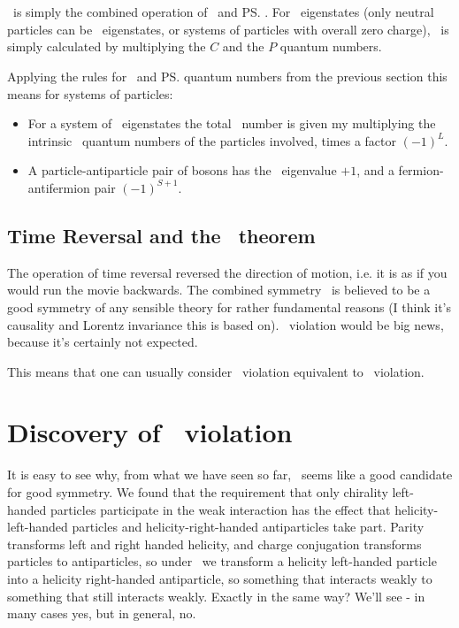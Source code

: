 \section{\cp}
\label{sec:CPV_CP}
 \cp\ is simply the combined operation of \cs\ and \ps.
 For \cp\ eigenstates (only neutral particles can be \cp\ eigenstates, or
 systems of particles with overall zero charge), \cp\ is simply
 calculated by multiplying the $C$ and the $P$ quantum numbers.

 Applying the rules for \cs\ and \ps quantum numbers from the
 previous section this means for systems of particles:
\begin{itemize}
\item For a system of \cp\ eigenstates the total \cp\ number is given my
  multiplying the intrinsic \cp\ quantum numbers of the particles
  involved, times a factor $(-1)^L$.
\item A particle-antiparticle pair of bosons has the \cp\ eigenvalue
  $+1$, and a fermion-antifermion pair $(-1)^{S+1}$.
\end{itemize}


\subsection{Time Reversal and the \cpt\ theorem}
 The operation of time reversal reversed the direction of motion,
 i.e. it is as if you would run the movie backwards. The combined
 symmetry \cpt\ is believed to be a good symmetry of any sensible theory
 for rather fundamental reasons (I think it's causality and Lorentz
 invariance this is based on). \cpt\ violation would be big news,
 because it's certainly not expected.

 This means that one can usually consider \cp\ violation equivalent to
 \ts\ violation.

\section{Discovery of \cp\ violation}

 It is easy to see why, from what we have seen so far, \cp\ seems like a
 good candidate for good symmetry. We found that the requirement that
 only chirality left-handed particles participate in the weak
 interaction has the effect that helicity-left-handed particles
 and helicity-right-handed antiparticles take part. Parity
 transforms left and right handed helicity, and charge conjugation
 transforms particles to antiparticles, so under \cp\ we transform a
 helicity left-handed particle into a helicity right-handed
 antiparticle, so something that interacts weakly to something that
 still interacts weakly. Exactly in the same way? We'll see - in many
 cases yes, but in general, no.


